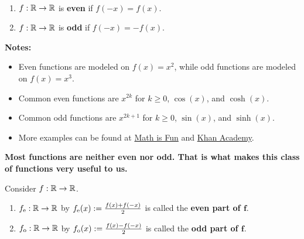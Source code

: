 \begin{tcolorbox}[colback=mylightblue, title = {\bf Even and Odd Functions, and Parts of Functions}, breakable]
 \begin{definition} \mbox{ }
\begin{enumerate}
\renewcommand{\labelenumi}{(\alph{enumi})}
\setlength{\itemsep}{.2cm}
     \item $f:\mathbb R \to \mathbb R$ is \textbf{even} if $f(-x) = f(x)$.
     \item $f:\mathbb R \to \mathbb R$ is \textbf{odd} if $f(-x) = -f(x)$.
 \end{enumerate}
\end{definition}  

\bigskip

\textbf{Notes:}
\begin{itemize}
    \item Even functions are modeled on $f(x) = x^2$, while odd functions are modeled on $f(x) = x^3.$
    \item Common even functions are $x^{2k}$ for $k\ge 0$, $\cos(x)$, and $\cosh(x)$.
    \item Common odd functions are $x^{2k+1}$ for $k\ge 0$, $\sin(x)$, and $\sinh(x)$.
    \item More examples can be found at \href{https://www.mathsisfun.com/algebra/functions-odd-even.html}{Math is Fun} and \href{https://www.khanacademy.org/math/algebra2/x2ec2f6f830c9fb89:transformations/x2ec2f6f830c9fb89:symmetry/v/even-and-odd-functions-equations}{Khan Academy}.
\end{itemize}

\bigskip
\textbf{Most functions are neither even nor odd. That is what makes this class of functions very useful to us.}

\bigskip

\begin{definition} 
Consider $f:\mathbb R \to \mathbb R$.
\begin{enumerate}
\renewcommand{\labelenumi}{(\alph{enumi})}
\setlength{\itemsep}{.2cm}
     \item $f_{\rm e}:\mathbb R \to \mathbb R$ by $f_{\rm e}(x) := \frac{f(x) + f(-x)}{2}$ is called the \textbf{even part of $\bm{f}$}.
     \item $f_{\rm o}:\mathbb R \to \mathbb R$ by $f_{\rm o}(x) := \frac{f(x) - f(-x)}{2}$ is called the \textbf{odd part of $\bm{f}$}.
 \end{enumerate}
\end{definition} 


\end{tcolorbox}
